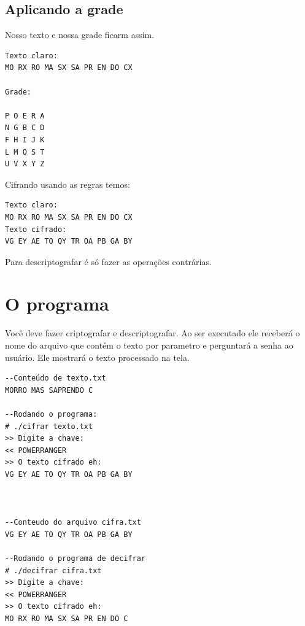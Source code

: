 \documentclass[12pt]{article}
\begin{document}
\subsection{Aplicando a grade}

Nosso texto e nossa grade ficarm assim.

\begin{verbatim}
Texto claro:
MO RX RO MA SX SA PR EN DO CX

Grade:

P O E R A
N G B C D
F H I J K
L M Q S T 
U V X Y Z
\end{verbatim}

Cifrando usando as regras temos:


\begin{verbatim}
Texto claro:
MO RX RO MA SX SA PR EN DO CX
Texto cifrado:
VG EY AE TO QY TR OA PB GA BY
\end{verbatim}

Para descriptografar é só fazer as operações contrárias.

\section{O programa}

Você deve fazer criptografar e descriptografar. Ao ser executado ele receberá o nome do arquivo
que contém o texto por parametro e perguntará a senha ao usuário. Ele mostrará o texto processado
na tela.


\begin{verbatim}
--Conteúdo de texto.txt
MORRO MAS SAPRENDO C 

--Rodando o programa:
# ./cifrar texto.txt
>> Digite a chave:
<< POWERRANGER
>> O texto cifrado eh:
VG EY AE TO QY TR OA PB GA BY



--Conteudo do arquivo cifra.txt
VG EY AE TO QY TR OA PB GA BY

--Rodando o programa de decifrar
# ./decifrar cifra.txt
>> Digite a chave:
<< POWERRANGER
>> O texto cifrado eh:
MO RX RO MA SX SA PR EN DO C

\end{verbatim}
\end{document}
